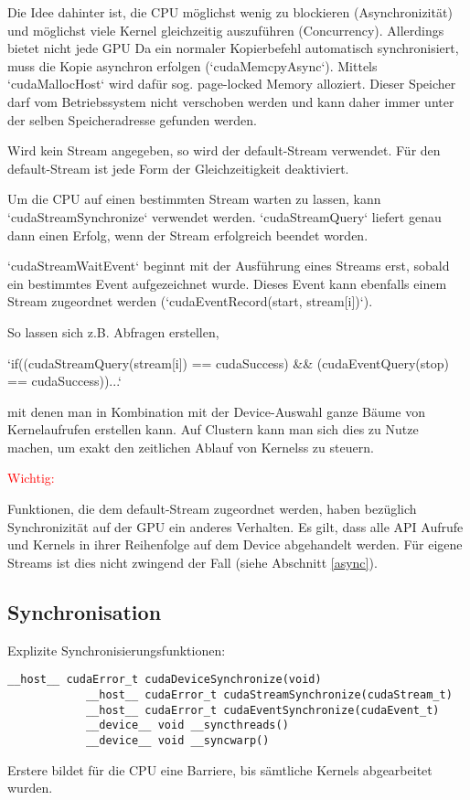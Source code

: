 		Die Idee dahinter ist, die CPU möglichst wenig zu blockieren (Asynchronizität) und möglichst viele \Gls{Kernel} gleichzeitig auszuführen (Concurrency). Allerdings bietet nicht jede GPU  Da ein normaler Kopierbefehl automatisch synchronisiert, muss die Kopie asynchron erfolgen (\li`cudaMemcpyAsync`). Mittels \li`cudaMallocHost` wird dafür sog. \gls{page-locked Memory} alloziert. Dieser Speicher darf vom Betriebssystem nicht verschoben werden und kann daher immer unter der selben Speicheradresse gefunden werden.
		
		Wird kein \Gls{Stream} angegeben, so wird der default-\Gls{Stream} verwendet. Für den default-Stream ist jede Form der Gleichzeitigkeit deaktiviert.
		
		Um die CPU auf einen bestimmten \Gls{Stream} warten zu lassen, kann \li`cudaStreamSynchronize` verwendet werden. \li`cudaStreamQuery` liefert genau dann einen Erfolg, wenn der \Gls{Stream} erfolgreich beendet worden.	
		
		\li`cudaStreamWaitEvent` beginnt mit der Ausführung eines \Glspl{Stream} erst, sobald ein bestimmtes Event aufgezeichnet wurde. Dieses Event kann ebenfalls einem \Gls{Stream} zugeordnet werden (\li`cudaEventRecord(start, stream[i])`).
		
		So lassen sich z.B. Abfragen erstellen,
		
		\li`if((cudaStreamQuery(stream[i]) == cudaSuccess) && (cudaEventQuery(stop) == cudaSuccess))...`
		
		mit denen man in Kombination mit der Device-Auswahl ganze Bäume von \Gls{Kernel}aufrufen erstellen kann. Auf Clustern kann man sich dies zu Nutze machen, um exakt den zeitlichen Ablauf von \Glspl{Kernel}s zu steuern.
		
		\textcolor{red}{Wichtig:}
		
		Funktionen, die dem default-\Gls{Stream} zugeordnet werden, haben bezüglich Synchronizität auf der GPU ein anderes Verhalten. Es gilt, dass alle \Gls{API} Aufrufe und \Glspl{Kernel} in ihrer Reihenfolge auf dem Device abgehandelt werden. Für eigene \Glspl{Stream} ist dies nicht zwingend der Fall (siehe Abschnitt \ref{async}).
		
		\subsection{Synchronisation}\label{sync}
		Explizite Synchronisierungsfunktionen:
		
		\begin{lstlisting}[caption=~Explizite Synchronisierung]
			__host__ cudaError_t cudaDeviceSynchronize(void)
			__host__ cudaError_t cudaStreamSynchronize(cudaStream_t)
			__host__ cudaError_t cudaEventSynchronize(cudaEvent_t)	
			__device__ void __syncthreads()
			__device__ void __syncwarp()
		\end{lstlisting}
		Erstere bildet für die CPU eine Barriere, bis sämtliche Kernels abgearbeitet wurden.
		
